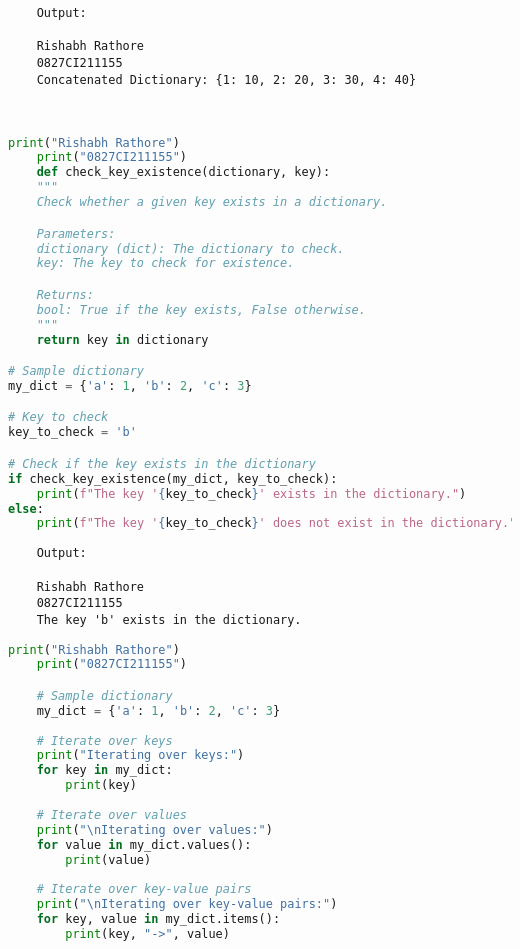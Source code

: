 \documentclass{report}
\begin{document}
\begin{verbatim}
	Output:

	Rishabh Rathore
	0827CI211155
	Concatenated Dictionary: {1: 10, 2: 20, 3: 30, 4: 40}

	

\end{verbatim}

\newpage


\sol 
\begin{lstlisting}[language=Python]
	print("Rishabh Rathore")
	print("0827CI211155")
	def check_key_existence(dictionary, key):
    """
    Check whether a given key exists in a dictionary.

    Parameters:
    dictionary (dict): The dictionary to check.
    key: The key to check for existence.

    Returns:
    bool: True if the key exists, False otherwise.
    """
    return key in dictionary

# Sample dictionary
my_dict = {'a': 1, 'b': 2, 'c': 3}

# Key to check
key_to_check = 'b'

# Check if the key exists in the dictionary
if check_key_existence(my_dict, key_to_check):
    print(f"The key '{key_to_check}' exists in the dictionary.")
else:
    print(f"The key '{key_to_check}' does not exist in the dictionary.")
\end{lstlisting}

\begin{verbatim}
	Output:

	Rishabh Rathore
	0827CI211155
	The key 'b' exists in the dictionary.	

\end{verbatim}


\newpage


\sol 
\begin{lstlisting}[language=Python]
	print("Rishabh Rathore")
	print("0827CI211155")

	# Sample dictionary
	my_dict = {'a': 1, 'b': 2, 'c': 3}
	
	# Iterate over keys
	print("Iterating over keys:")
	for key in my_dict:
		print(key)
	
	# Iterate over values
	print("\nIterating over values:")
	for value in my_dict.values():
		print(value)
	
	# Iterate over key-value pairs
	print("\nIterating over key-value pairs:")
	for key, value in my_dict.items():
		print(key, "->", value)
	

\end{lstlisting}
\end{document}
